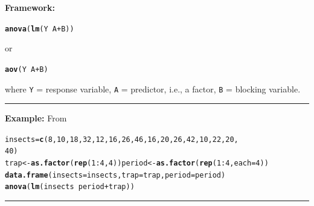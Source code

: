 \documentclass[12pt,english]{article}\usepackage[]{graphicx}\usepackage[table]{xcolor}
\makeatletter
\newcommand{\hlopt}[1]{\textcolor[rgb]{0,0,0}{#1}}%
\newcommand{\hldef}[1]{\textcolor[rgb]{0.345,0.345,0.345}{#1}}%
\newcommand{\hlkwd}[1]{\textcolor[rgb]{0.737,0.353,0.396}{\textbf{#1}}}%
\newenvironment{kframe}{%
 \def\at@end@of@kframe{}%
 \ifinner\ifhmode%
  \def\at@end@of@kframe{\end{minipage}}%
  \begin{minipage}{\columnwidth}%
 \fi\fi%
 \def\FrameCommand##1{\hskip\@totalleftmargin \hskip-\fboxsep
 \colorbox{shadecolor}{##1}\hskip-\fboxsep
     \hskip-\linewidth \hskip-\@totalleftmargin \hskip\columnwidth}%
 \MakeFramed {\advance\hsize-\width
   \@totalleftmargin\z@ \linewidth\hsize
   \@setminipage}}%
 {\par\unskip\endMakeFramed%
 \at@end@of@kframe}
\newenvironment{knitrout}{}{} %
\makeatother
\begin{document}
\begin{tcolorbox}[colback=yellow!50!red!25!white,colbacktitle=yellow!50!red,colframe=black!75!white,title=\textbf{R:} RCBD]
\textbf{Framework:}\\
\vspace{-.2in}
\begin{knitrout}
\color{fgcolor}\begin{kframe}
\begin{alltt}
\hlkwd{anova}\hldef{(}\hlkwd{lm}\hldef{(Y} \hlopt{~} \hldef{A} \hlopt{+} \hldef{B))}
\end{alltt}
\end{kframe}
\end{knitrout}
\vspace{-.1in}
or
\vspace{-.1in}
\begin{knitrout}
\color{fgcolor}\begin{kframe}
\begin{alltt}
\hlkwd{aov}\hldef{(Y} \hlopt{~} \hldef{A} \hlopt{+} \hldef{B)}
\end{alltt}
\end{kframe}
\end{knitrout}
where \texttt{Y} = response variable, \texttt{A} = predictor, i.e., a factor, \texttt{B} = blocking variable.
\vspace{0.1in}
\par\noindent\rule{.9\textwidth}{0.4pt}

\textbf{Example:} From \citep[][Ex. 2.3.1]{hoshmand}
\vspace{-.1in}
\begin{knitrout}
\color{fgcolor}\begin{kframe}
\begin{alltt}
insects = \hlkwd{c}(8, 10, 18, 32, 12, 16, 26, 46, 16, 20, 26, 42, 10, 22, 20,
            40)
trap <- \hlkwd{as.factor}(\hlkwd{rep}(1:4, 4)) period <- \hlkwd{as.factor}(\hlkwd{rep}(1:4, each = 4))
\hlkwd{data.frame}(insects = insects, trap = trap, period = period)
\hlkwd{anova}(\hlkwd{lm}(insects ~ period + trap))
\end{alltt}
\end{kframe}
\end{knitrout}
\end{tcolorbox}

\par\noindent\rule{.9\textwidth}{0.4pt}
\end{document}

